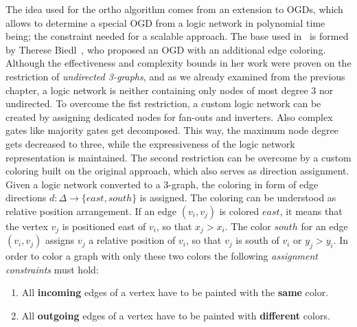 The idea used for the ortho algorithm comes from an extension to OGDs, which allows to determine a special OGD from a logic network in polynomial time being; the constraint needed for a scalable approach. The base used in~\cite{ortho} is formed by Therese Biedl~\cite{biedl1998better}, who proposed an OGD with an additional edge coloring. Although the effectiveness and complexity bounds in her work were proven on the restriction of \emph{undirected 3-graphs}, and as we already examined from the previous chapter, a logic network is neither containing only nodes of most degree 3 nor undirected. To overcome the fist restriction, a custom logic network can be created by assigning dedicated nodes for fan-outs and inverters. Also complex gates like majority gates get decomposed. This way, the maximum node degree gets decreased to three, while the expressiveness of the logic network representation is maintained. The second restriction can be overcome by a custom coloring built on the original approach, which also serves as direction assignment. Given a logic network converted to a 3-graph, the coloring in form of edge directions $d : \Delta \rightarrow \{east, south\}$ is assigned. The coloring can be understood as relative position arrangement. If an edge $(v_i, v_j)$ is colored $east$, it means that the vertex $v_j$ is positioned east of $v_i$, so that $x_j > x_i$. The color $south$ for an edge $(v_i, v_j)$ assigns $v_j$ a relative position of $v_i$, so that $v_j$ is south of $v_i$ or $y_j > y_i$. In order to color a graph with only these two colors the following \emph{assignment constraints} must hold:

\begin{enumerate}
	\item All \textbf{incoming} edges of a vertex have to be painted with the \textbf{same} color.
	\item All \textbf{outgoing} edges of a vertex have to be painted with \textbf{different} colors.
\end{enumerate}

